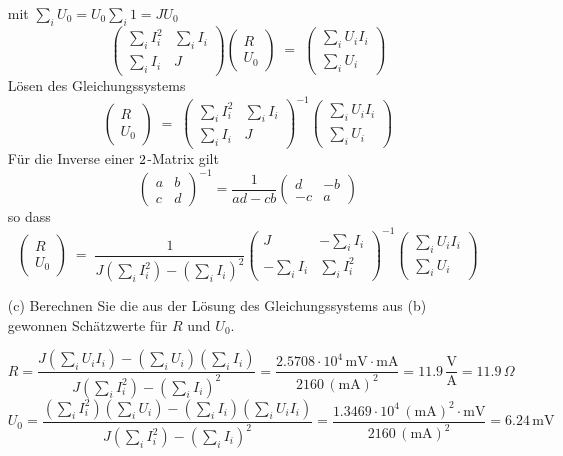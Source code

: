 \begin{itemize}
$$$$
mit $\sum_i U_0 = U_0 \sum_i 1 = J U_0$
\begin{equation*}
\left(\begin{array}{cc}
\sum_i I_i^2 & \sum_i I_i\\
\sum_i I_i & J
\end{array}\right)
\left(\begin{array}{c}
R\\
U_0
\end{array}\right)
 \; = \;
\left(\begin{array}{c}
\sum_i U_i I_i\\
\sum_i U_i
\end{array}\right)
\end{equation*}
Lösen des Gleichungssystems
\begin{equation*}
\left(\begin{array}{c}
R\\
U_0
\end{array}\right)
 \; = \;
 \left(\begin{array}{cc}
 \sum_i I_i^2 & \sum_i I_i\\
 \sum_i I_i & J
 \end{array}\right)^{-1}
\left(\begin{array}{c}
\sum_i U_i I_i\\
\sum_i U_i
\end{array}\right)
\end{equation*}
Für die Inverse einer $2 \time 2$-Matrix gilt
$$
\left(\begin{array}{cc}
a & b\\
c & d
\end{array}\right)^{-1} = \frac{1}{ad - cb}
\left(\begin{array}{cc}
d & -b\\
-c & a
\end{array}\right)
$$
so dass
$$
\left(\begin{array}{c}
R\\
U_0
\end{array}\right)
 \; = \;
 \frac{1}{J (\sum_i I_i^2) - \left( \sum_i I_i \right)^2}
 \left(\begin{array}{cc}
 J & -\sum_i I_i\\
 -\sum_i I_i & \sum_i I_i^2
 \end{array}\right)^{-1}
\left(\begin{array}{c}
\sum_i U_i I_i\\
\sum_i U_i
\end{array}\right)
$$
\item[(c)] Berechnen Sie die aus der Lösung des Gleichungssystems aus (b) gewonnen Schätzwerte
für $R$ und $U_0$.

$$
R = \frac{J(\sum_i U_i I_i) - (\sum_i U_i)(\sum_i I_i)}
{J (\sum_i I_i^2) - \left( \sum_i I_i \right)^2} =
\frac{2.5708 \cdot 10^4 \, \mathrm{m V} \cdot \mathrm{m A}}
{2160 \, (\mathrm{m A})^2} = 11.9 \, \frac{\mathrm{V}}{\mathrm{A}} = 11.9 \, \Omega
$$
$$
U_0 = \frac{(\sum_i I_i^2)(\sum_i U_i) - (\sum_i I_i)(\sum_i U_i I_i)}
{J (\sum_i I_i^2) - \left( \sum_i I_i \right)^2} =
\frac{1.3469 \cdot 10^4 \, (\mathrm{m A})^2 \cdot \mathrm{m V}}
{2160 \, (\mathrm{m A})^2} = 6.24 \, \mathrm{m V}
$$

\end{itemize}
